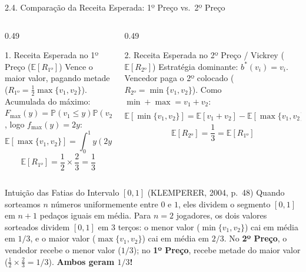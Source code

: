 \documentclass[aspectratio=169, 10pt]{beamer}
\newcommand{\defbox}[2]{%
  \begin{block}{#1}
    \footnotesize\setlength{\abovedisplayskip}{4pt}\setlength{\belowdisplayskip}{4pt}
    #2\par
  \end{block}%
}
\newcommand{\exbox}[2]{%
  \begin{exampleblock}{#1}
    \footnotesize\setlength{\abovedisplayskip}{4pt}\setlength{\belowdisplayskip}{4pt}
    #2\par
  \end{exampleblock}%
}
\begin{document}
\begin{frame}{2.4. Comparação da Receita Esperada: 1º Preço vs.\ 2º Preço}
  \begin{columns}[T, onlytextwidth]
    \begin{column}{0.49\textwidth}
      \defbox{1. Receita Esperada no 1º Preço ($\mathbb{E}[R_{\text{1º}}]$)}{%
        Vence o maior valor, pagando metade ($R_{\text{1º}} =
        \frac{1}{2}\max\{v_1, v_2\}$).\\
        Acumulada do máximo: $F_{\max}(y) = \mathbb{P}(v_1 \le
        y)\mathbb{P}(v_2 \le y) = y^2$, logo $f_{\max}(y) = 2y$:
        \[
          \mathbb{E}[\max\{v_1, v_2\}] = \int_0^1 y(2y)\,dy = \frac{2}{3}
        \]
        \[
          \boxed{\mathbb{E}[R_{\text{1º}}] =
          \frac{1}{2}\times\frac{2}{3} = \frac{1}{3}}
        \]
      }
    \end{column}
    \begin{column}{0.49\textwidth}
      \defbox{2. Receita Esperada no 2º Preço / Vickrey
      ($\mathbb{E}[R_{\text{2º}}]$)}{%
        Estratégia dominante: $b^\ast(v_i) = v_i$. Vencedor paga o 2º
        colocado ($R_{\text{2º}} = \min\{v_1, v_2\}$). Como $\min +
        \max = v_1 + v_2$:
        \[
          \mathbb{E}[\min\{v_1, v_2\}] = \mathbb{E}[v_1 + v_2] -
          \mathbb{E}[\max\{v_1, v_2\}] = 1 - \frac{2}{3} = \frac{1}{3}
        \]
        \[
          \boxed{\mathbb{E}[R_{\text{2º}}] = \frac{1}{3} =
          \mathbb{E}[R_{\text{1º}}]}
        \]
      }
    \end{column}
  \end{columns}
  \vspace{0.05cm}
  \exbox{Intuição das Fatias do Intervalo $[0,1]$ (KLEMPERER, 2004, p.\ 48)}{%
    Quando sorteamos $n$ números uniformemente entre $0$ e $1$, eles
    dividem o segmento $[0,1]$ em $n+1$ pedaços iguais em média. Para
    $n=2$ jogadores, os dois valores sorteados dividem $[0,1]$ em 3
    terços: o menor valor ($\min\{v_1, v_2\}$) cai em média em $1/3$,
    e o maior valor ($\max\{v_1, v_2\}$) cai em média em $2/3$. No
    \textbf{2º Preço}, o vendedor recebe o menor valor ($1/3$); no
    \textbf{1º Preço}, recebe metade do maior valor ($\frac{1}{2}
    \times \frac{2}{3} = 1/3$). \textbf{Ambos geram $1/3$!}
  }
\end{frame}
\end{document}
